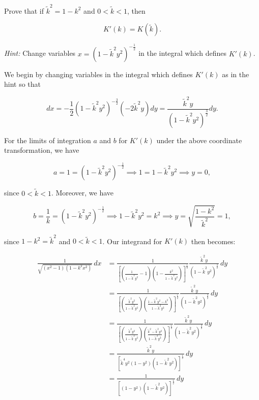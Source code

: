 Prove that if $\tilde{k}^2 = 1 - k^2$ and $0 < \tilde{k} < 1$, then

$$
K'(k) = K(\tilde{k}).
$$

\newcommand{\kt}{\tilde{k}}

\textit{Hint:} Change variables $x = \left(1 - \tilde{k}^2 y^2\right)^{-\frac{1}{2}}$ in the integral which defines $K'(k)$.

\begin{solution}
  We begin by changing variables in the integral which defines $K'(k)$ as in the hint so that

  $$
  dx = -\frac{1}{2}\left(1 - \kt^2 y^2 \right)^{-\frac{3}{2}}\left(-2 \kt^2 y\right) dy 
     = \frac{\kt^2 y}{\left(1 - \kt^2 y^2\right)^{\frac{3}{2}}} dy.
  $$

  For the limits of integration $a$ and $b$ for $K'(k)$ under the above coordinate transformation, we have

  $$
  a = 1 
    = \left(1 - \kt^2 y^2\right)^{-\frac{1}{2}} 
      \implies 1 = 1 - \kt^2 y^2 
      \implies y = 0,
  $$

  since $0 < \kt < 1$. Moreover, we have

  $$
  b = \frac{1}{k} 
    = \left(1 - \kt^2 y^2\right)^{-\frac{1}{2}} 
      \implies 1 - \kt^2 y^2 = k^2 
      \implies y = \sqrt{\frac{1 - k^2}{\kt^2}} = 1,
  $$

  since $1 - k^2 = \kt^2$ and $0 < \kt < 1$. Our integrand for $K'(k)$ then becomes:

  \begin{align*}
    \frac{1}{\sqrt{\left(x^2 - 1\right)\left(1 - k^2 x^2\right)}} \, dx
      &= \frac{1}{\left[\left(\frac{1}{1 - \kt^2 y^2} - 1 \right) \left(1 - \frac{k^2}{1 - \kt^2 y^2} \right)\right]^{\frac{1}{2}}}
         \frac{\kt^2 y}{\left(1 - \kt^2 y^2\right)^{\frac{3}{2}}} \, dy \\
      &= \frac{1}{\left[\left(\frac{\kt^2 y^2}{1 - \kt^2 y^2}\right) \left(\frac{1 - \kt^2 y^2 - k^2}{1 - \kt^2 y^2} \right)\right]^{\frac{1}{2}}}
         \frac{\kt^2 y}{\left(1 - \kt^2 y^2\right)^{\frac{3}{2}}} \, dy \\
      &= \frac{1}{\left[\left(\frac{\kt^2 y^2}{1 - \kt^2 y^2}\right) \left(\frac{\kt^2 - \kt^2 y^2}{1 - \kt^2 y^2} \right)\right]^{\frac{1}{2}}}
         \frac{\kt^2 y}{\left(1 - \kt^2 y^2\right)^{\frac{3}{2}}} \, dy \\
      &= \frac{\kt^2 y}{\left[\kt^4 y^2 (1 - y^2)(1 - \kt^2 y^2) \right]^{\frac{1}{2}}} \, dy \\
      &= \frac{1}{\left[(1 - y^2)(1 - \kt^2 y^2) \right]^{\frac{1}{2}}} \, dy \\
  \end{align*}


\end{solution}
